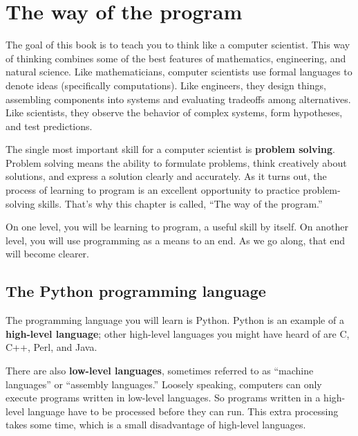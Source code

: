 \documentclass[10pt]{book}
\begin{document}
\normalsize

\clearemptydoublepage

\begin{latexonly}

\tableofcontents

\clearemptydoublepage

\end{latexonly}

\mainmatter


\chapter{The way of the program}

The goal of this book is to teach you to think like a
computer scientist.  This way of thinking combines some of the best features
of mathematics, engineering, and natural science.  Like mathematicians,
computer scientists use formal languages to denote ideas (specifically
computations).  Like engineers, they design things, assembling components
into systems and evaluating tradeoffs among alternatives.  Like scientists,
they observe the behavior of complex systems, form hypotheses, and test
predictions.


The single most important skill for a computer scientist is {\bf
problem solving}.  Problem solving means the ability to formulate
problems, think creatively about solutions, and express a solution clearly
and accurately.  As it turns out, the process of learning to program is an
excellent opportunity to practice problem-solving skills.  That's why
this chapter is called, ``The way of the program.''

On one level, you will be learning to program, a useful
skill by itself.  On another level, you will use programming as a means to
an end.  As we go along, that end will become clearer.

\section{The Python programming language}

The programming language you will learn is Python. Python is
an example of a {\bf high-level language}; other high-level languages
you might have heard of are C, C++, Perl, and Java.

There are
also {\bf low-level languages}, sometimes referred to as ``machine
languages'' or ``assembly languages.''  Loosely speaking, computers
can only execute programs written in low-level languages.  So
programs written in a high-level language have to be processed before
they can run.  This extra processing takes some time, which is a small
disadvantage of high-level languages.
\end{document}
